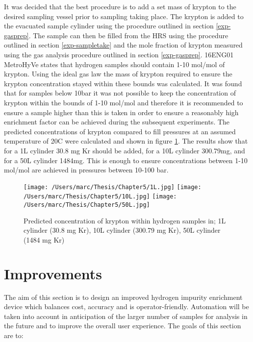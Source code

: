 It was decided that the best procedure is to add a set mass of krypton to the desired sampling vessel prior to sampling taking place. The krypton is added to the evacuated sample cylinder using the procedure outlined in section \ref{exp-gasprep}. The sample can then be filled from the HRS using the procedure outlined in section \ref{exp-sampletake} and the mole fraction of krypton measured using the gas analysis procedure outlined in section \ref{exp-gasprep}. 16ENG01 MetroHyVe states that hydrogen samples should contain 1-10 \textmu mol/mol of krypton. Using the ideal gas law the mass of krypton required to ensure the krypton concentration stayed within these bounds was calculated. It was found that for samples below 10bar it was not possible to keep the concentration of krypton within the bounds of 1-10 \textmu mol/mol and therefore it is recommended to ensure a sample higher than this is taken in order to ensure a reasonably high enrichment factor can be achieved during the subsequent experiments. The predicted concentrations of krypton compared to fill pressures at an assumed temperature of 20\textdegree C were calculated and shown in figure \ref{krsamples}. The results show that for a 1L cylinder 30.8 mg Kr should be added, for a 10L cylinder 300.79mg, and for a 50L cylinder 1484mg. This is enough to ensure concentrations between 1-10 \textmu mol/mol are achieved in pressures between 10-100 bar. 

\begin{figure}[H]
    \centering
    \texttt{[image: /Users/marc/Thesis/Chapter5/1L.jpg]}
    \texttt{[image: /Users/marc/Thesis/Chapter5/10L.jpg]}
    \texttt{[image: /Users/marc/Thesis/Chapter5/50L.jpg]}
    \caption{Predicted concentration of krypton within hydrogen samples in; 1L cylinder (30.8 mg Kr), 10L cylinder (300.79 mg Kr), 50L cylinder (1484 mg Kr)}
    \label{krsamples}
  \end{figure}

\section{Improvements}
The aim of this section is to design an improved hydrogen impurity enrichment device which balances cost, accuracy and is operator-friendly. Automation will be taken into account in anticipation of the larger number of samples for analysis in the future and to improve the overall user experience. The goals of this section are to:

